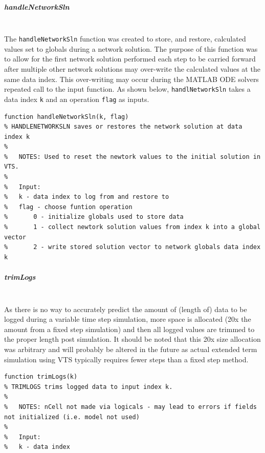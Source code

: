 \documentclass[12pt]{article}
\begin{document}
\pagebreak
\subparagraph{handleNetworkSln} \ \\
The \verb|handleNetworkSln| function was created to store, and restore, calculated values set to globals during a network solution.
The purpose of this function was to allow for the first network solution performed each step to be carried forward after multiple other network solutions may over-write the calculated values at the same data index.
This over-writing may occur during the MATLAB ODE solvers repeated call to the input function.
As shown below, \verb|handlNetworkSln| takes a data index \verb|k| and an operation \verb|flag| as inputs.
\begin{verbatim}
function handleNetworkSln(k, flag)
% HANDLENETWORKSLN saves or restores the network solution at data index k
%
%   NOTES: Used to reset the newtork values to the initial solution in VTS.
%
%   Input:
%   k - data index to log from and restore to
%   flag - choose funtion operation
%       0 - initialize globals used to store data
%       1 - collect newtork solution values from index k into a global vector
%       2 - write stored solution vector to network globals data index k
\end{verbatim}

\subparagraph{trimLogs} \ \\
As there is no way to accurately predict the amount of (length of) data to be logged during a variable time step simulation, more space is allocated (20x the amount from a fixed step simulation) and then all logged values are trimmed to the proper length post simulation.
It should be noted that this 20x size allocation was arbitrary and will probably be altered in the future as actual extended term simulation using VTS typically requires fewer steps than a fixed step method.

\begin{verbatim}
function trimLogs(k)
% TRIMLOGS trims logged data to input index k.
%
%   NOTES: nCell not made via logicals - may lead to errors if fields not initialized (i.e. model not used)
%
%   Input:
%   k - data index
\end{verbatim} 
\end{document}
